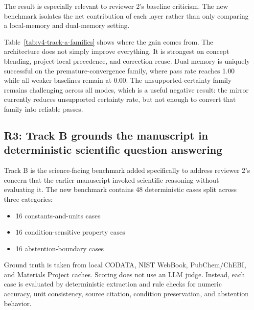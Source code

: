 \documentclass[12pt]{article}
\begin{document}
The result is especially relevant to reviewer 2's baseline criticism. The new benchmark isolates the net contribution of each layer rather than only comparing a local-memory and dual-memory setting.

\begin{table}[H]
\centering
{}
\caption{Table 2. Track A family-level pass rates. Each family contains five theme variants.}
\label{tab:v4-track-a-families}
\end{table}

Table~\ref{tab:v4-track-a-families} shows where the gain comes from. The architecture does not simply improve everything. It is strongest on concept blending, project-local precedence, and correction reuse. Dual memory is uniquely successful on the premature-convergence family, where pass rate reaches 1.00 while all weaker baselines remain at 0.00. The unsupported-certainty family remains challenging across all modes, which is a useful negative result: the mirror currently reduces unsupported certainty rate, but not enough to convert that family into reliable passes.

\subsection{R3: Track B grounds the manuscript in deterministic scientific question answering}

Track B is the science-facing benchmark added specifically to address reviewer 2's concern that the earlier manuscript invoked scientific reasoning without evaluating it. The new benchmark contains 48 deterministic cases split across three categories:
\begin{itemize}
\item 16 constants-and-units cases
\item 16 condition-sensitive property cases
\item 16 abstention-boundary cases
\end{itemize}
Ground truth is taken from local CODATA, NIST WebBook, PubChem/ChEBI, and Materials Project caches. Scoring does not use an LLM judge. Instead, each case is evaluated by deterministic extraction and rule checks for numeric accuracy, unit consistency, source citation, condition preservation, and abstention behavior.
\end{document}
